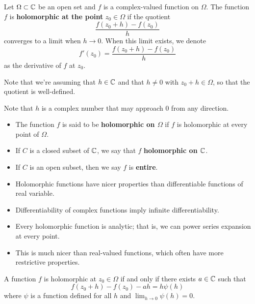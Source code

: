 \documentclass[11pt,a4paper]{book}
\begin{document}
\begin{definition}
    Let \( \Omega \subset \mathbb{C}   \) be an open set and \( f  \) is a complex-valued function on \( \Omega  \). The function \( f  \) is \textbf{holomorphic at the point} \( {z}_{0} \in \Omega  \) if the quotient 
    \[  \frac{ f({z}_{0} + h) - f({z}_{0})  }{ h  }  \]
    converges to a limit when \( h \to  0  \). When this limit exists, we denote
    \[  f'({z}_{0}) = \frac{ f({z}_{0} + h ) - f({z}_{0}) }{ h }  \]
    as the derivative of \( f  \) at \( {z}_{0} \).
\end{definition}

Note that we're assuming that \( h \in \mathbb{C}  \) and that \(  h \neq 0  \) with \( {z}_{0} + h \in \Omega  \), so that the quotient is well-defined. 

Note that \( h  \) is a complex number that may approach \( 0  \) from any direction.

\begin{definition}
    \begin{itemize}
        \item The function \( f  \) is said to be \textbf{holomorphic on \( \Omega \)} if \( f  \) is holomorphic at every point of \( \Omega  \).
        \item If \( C  \) is a closed subset of \( \mathbb{C}  \), we say that \( f  \) \textbf{holomorphic on \( \mathbb{C}  \)}.
        \item If \( C  \) is an open subset, then we say \( f  \) is \textbf{entire}.
    \end{itemize}
\end{definition}

\begin{itemize}
    \item Holomorphic functions have nicer properties than differentiable functions of real variable.
    \item Differentiability of complex functions imply infinite differentiability.
    \item Every holomorphic function is analytic; that is, we can power series expansion at every point.
    \item This is much nicer than real-valued functions, which often have more restrictive properties.
\end{itemize}

\begin{prop}
    A function \( f  \) is holomorphic at \( {z}_{0} \in \Omega  \) if and only if there exists \( a \in \mathbb{C}  \) such that
    \[  f({z}_{0} + h) - f({z}_{0}) - ah = h \psi(h) \]
    where \( \psi  \) is a function defined for all \( h  \) and \( \lim_{ h \to 0 } \psi(h) = 0 \).
\end{prop}
\end{document}
